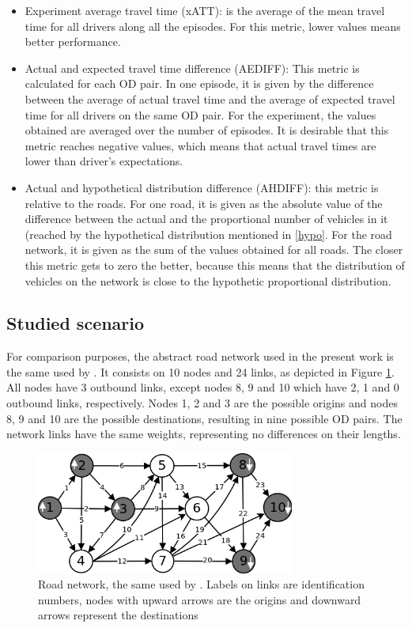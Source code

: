 \documentclass[12pt]{llncs}
\begin{document}
\begin{itemize}
	\item Experiment average travel time (xATT): is the average of the mean travel time for all drivers along all the episodes. For this metric, lower values means better performance.
	\item Actual and expected travel time difference (AEDIFF): This metric is calculated for each OD pair. In one episode, it is given by the difference between the average of actual travel time and the average of expected travel time for all drivers on the same OD pair. For the experiment, the values obtained are averaged over the number of episodes. It is desirable that this metric reaches negative values, which means that actual travel times are lower than driver's expectations.
	\item Actual and hypothetical distribution difference (AHDIFF): this metric is relative to the roads. For one road, it is given as the absolute value of the difference between the actual and the proportional number of vehicles in it (reached by the hypothetical distribution mentioned in \ref{hypo}. For the road network, it is given as the sum of the values obtained for all roads. The closer this metric gets to zero the better, because this means that the distribution of vehicles on the network is close to the hypothetic proportional distribution.
\end{itemize}

\subsection{Studied scenario}

For comparison purposes, the abstract road network used in the present work is the same used by \cite{Galib&Moser2011}. It consists on 10 nodes and 24 links, as depicted in Figure \ref{fig:roadnetwork}. All nodes have 3 outbound links, except nodes 8, 9 and 10 which have 2, 1 and 0 outbound links, respectively. Nodes 1, 2 and 3 are the possible origins and nodes 8, 9 and 10 are the possible destinations, resulting in nine possible OD pairs. The network links have the same weights, representing no differences on their lengths.

\begin{figure}[ht]
    \centerline{\includegraphics[width=8.5cm]{img/roadnetwork.png}}
    \caption{Road network, the same used by \cite{Galib&Moser2011}. Labels on links are identification numbers, nodes with upward arrows are the origins and downward arrows represent the destinations}
    \label{fig:roadnetwork}
\end{figure}
\end{document}

